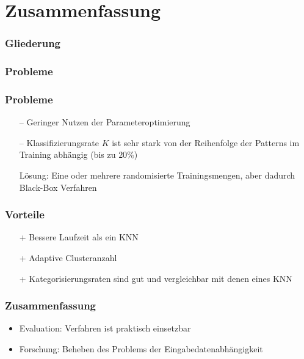 \documentclass[12pt]{beamer}
\begin{document}
\section{Zusammenfassung}
%
\begin{frame}
  \frametitle{Gliederung}
  \tableofcontents[currentsection]
\end{frame}
%
\begin{frame}
  \frametitle<presentation>{Probleme}
	\frametitle{Probleme}
	\begin{itemize}
		\item[--] Geringer Nutzen der Parameteroptimierung
		\item[--] Klassifizierungsrate $K$ ist sehr stark von der Reihenfolge der Patterns im Training abhängig (bis zu $20\%$) 
		\item[ ] Lösung: Eine oder mehrere randomisierte Trainingsmengen, aber dadurch Black-Box Verfahren
	\end{itemize}
\end{frame}
%
\begin{frame}
  \frametitle{Vorteile}
	\begin{itemize}
		\item[+] Bessere Laufzeit als ein KNN
		\item[+] Adaptive Clusteranzahl
  	  	\item[+] Kategorisierungsraten sind gut und vergleichbar mit denen eines KNN
\end{itemize}
\end{frame}
%
\large
\begin{frame}
  \frametitle<presentation>{Zusammenfassung}
%
	\begin{itemize}
		\item Evaluation: Verfahren ist praktisch einsetzbar
		\item Forschung: Beheben des Problems der Eingabedatenabhängigkeit
\end{itemize}
\end{frame}
%
\LARGE
\end{document}
